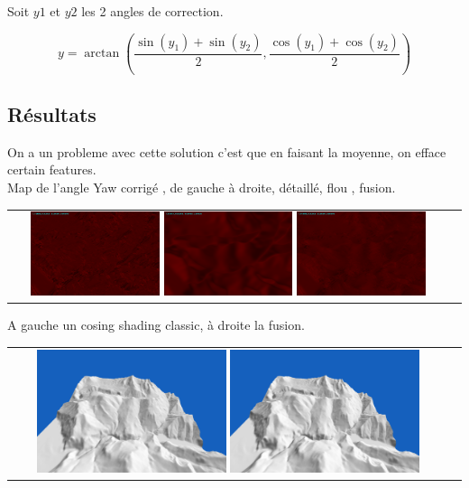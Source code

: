 \documentclass[a4paper]{article}
\begin{document}
Soit $y1$ et $y2$ les 2 angles de correction. 

\[y = \arctan\left(\frac{\sin(y_1)+\sin(y_2)}{2} , \frac{\cos(y_1)+\cos(y_2)}{2} \right)\]



\subsection{Résultats}
On a un probleme avec cette solution c'est que en faisant la moyenne, on efface certain features. \\
Map de l'angle Yaw corrigé , de gauche à droite, détaillé, flou , fusion.

\begin{tabular}{cc}
\includegraphics[width=0.3\textwidth]{Images/Essais/Essai_13_details.png}
\includegraphics[width=0.3\textwidth]{Images/Essais/Essai_13_flou.png}
\includegraphics[width=0.3\textwidth]{Images/Essais/Essai_13_fusion.png}
\end{tabular}

A gauche un cosing shading classic, à droite la fusion. \\
\begin{tabular}{cc}
\includegraphics[width=0.44\textwidth]{Images/Essais/Essai_13_phong_world.png}
\includegraphics[width=0.44\textwidth]{Images/Essais/Essai_13_fusion_world.png}
\end{tabular}
\end{document}
